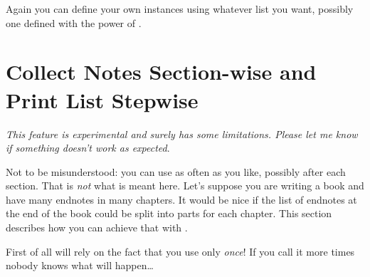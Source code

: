 \documentclass[toc=bib,toc=index]{cnpkgdoc}
\begin{document}
Again you can define your own instances using whatever list you want, possibly
one defined with the power of .

\section{Collect Notes Section-wise and Print List Stepwise}\label{sec:split}
\emph{This feature is experimental and surely has some limitations. Please let
me know if something doesn't work as expected}.

Not to be misunderstood: you can use  as often as you like,
possibly after each section. That is \emph{not} what is meant here. Let's
suppose you are writing a book and have many endnotes in many chapters. It
would be nice if the list of endnotes at the end of the book could be split
into parts for each chapter. This section describes how you can achieve that with
\enotez.

First of all \enotez will rely on the fact that you use 
only \emph{once}! If you call it more times nobody knows what will happen\ldots
\end{document}
